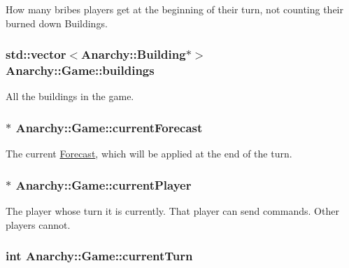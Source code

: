 How many bribes players get at the beginning of their turn, not counting their burned down Buildings. 

\hypertarget{classAnarchy_1_1Game_afed9b69dccd790514505d662b84d5573}{
\subsubsection[{buildings}]{\setlength{\rightskip}{0pt plus 5cm}std\-::vector$<${\bf Anarchy\-::\-Building}$\ast$$>$ Anarchy\-::\-Game\-::buildings}}\label{classAnarchy_1_1Game_afed9b69dccd790514505d662b84d5573}


All the buildings in the game. 

\hypertarget{classAnarchy_1_1Game_a4429e9c4a6613416867b241c37616562}{
\subsubsection[{current\-Forecast}]{$\ast$ Anarchy\-::\-Game\-::current\-Forecast}}\label{classAnarchy_1_1Game_a4429e9c4a6613416867b241c37616562}


The current \hyperlink{classAnarchy_1_1Forecast}{Forecast}, which will be applied at the end of the turn. 

\hypertarget{classAnarchy_1_1Game_ab9c7ef6e3dc9841ebfd6e30423d31677}{
\subsubsection[{current\-Player}]{$\ast$ Anarchy\-::\-Game\-::current\-Player}}\label{classAnarchy_1_1Game_ab9c7ef6e3dc9841ebfd6e30423d31677}


The player whose turn it is currently. That player can send commands. Other players cannot. 

\hypertarget{classAnarchy_1_1Game_a5ce8941697b3ca1e33d4a98b33a9c797}{
\subsubsection[{current\-Turn}]{\setlength{\rightskip}{0pt plus 5cm}int Anarchy\-::\-Game\-::current\-Turn}}\label{classAnarchy_1_1Game_a5ce8941697b3ca1e33d4a98b33a9c797}


